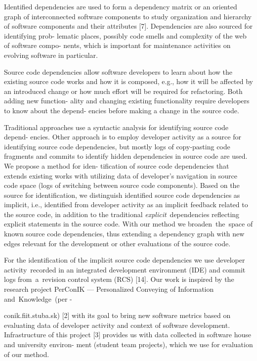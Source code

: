 \documentclass[a4paper]{llncs}
\begin{document}
Identified dependencies are used to form a dependency matrix or an oriented graph of interconnected software components to study organization and hierarchy of software components and their attributes [7]. Dependencies are also sourced for identifying prob- lematic places, possibly code smells and complexity of the web of software compo- nents, which is important for maintenance activities on evolving software in particular.

Source code dependencies allow software developers to learn about how the existing source code works and how it is composed, e.g., how it will be affected by an introduced 
\newpage \noindent 
change or how much effort will be required for refactoring. Both adding new function- ality and changing existing functionality require developers to know about the depend- encies before making a change in the source code.

Traditional approaches use a syntactic analysis for identifying source code depend- encies. Other approach is to employ developer activity as a source for identifying source code dependencies, but mostly logs of copy-pasting code fragments and commits to identify hidden dependencies in source code are used. We propose a method for iden- tification of source code dependencies that extends existing works with utilizing data of developer’s navigation in source code space (logs of switching between source code components). Based on the source for identification, we distinguish identified source code dependencies as implicit, i.e., identified from developer activity as an implicit feedback related to the source code, in addition to the traditional \textit{explicit}~dependencies reflecting explicit statements in the source code. With our method we broaden~the~space of known source code dependencies, thus extending a dependency graph with new edges relevant for the development or other evaluations of the source code.

For the identification of the implicit source code dependencies we use developer
activity~recorded in an integrated development environment (IDE) and commit logs from~a~revision control system (RCS) [14]. Our work is inspired by the research project PerConIK  --- Personalized Conveying of Information and~Knowledge~(per - 

\noindent conik.fiit.stuba.sk) [2] with its goal to bring new software metrics based on evaluating data of developer activity and context of software development. Infrastructure of this project [3] provides us with data collected in software house and university environ- ment (student team projects), which we use for evaluation of our method.
\end{document}
